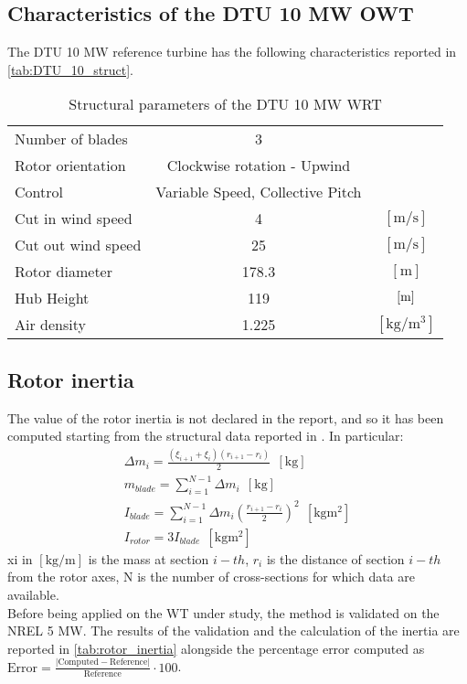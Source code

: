 \subsection{Characteristics of the DTU 10 MW OWT}
The DTU 10 MW reference turbine has the following characteristics reported in \autoref{tab:DTU_10_struct}.
\begin{table}[htb]
    \caption{Structural parameters of the DTU 10 MW \acrshort{WRT}}
    \centering
    \begin{tabular}{lcc}
    \toprule
    Number of blades & 3 & \\
    Rotor orientation & Clockwise rotation - Upwind & \\
    Control & Variable Speed, Collective Pitch & \\
    Cut in wind speed & 4 & $\left[\si{\meter \per \second}\right]$ \\
    Cut out wind speed & 25 & $\left[\si{\meter \per \second}\right]$ \\
    Rotor diameter & 178.3 & $\left[\si{\meter}\right]$\\
    Hub Height & 119 & $\left[\si{\meter}\right]$\\
    Air density & 1.225 & $\left[\si{\kilo\gram\per\cubic\meter}\right]$\\
    \bottomrule
    \end{tabular}
    \label{tab:DTU_10_struct}
\end{table}

\subsection{Rotor inertia}
The value of the rotor inertia is not declared in the report, and so it has been computed starting from the structural data reported in \cite{DTU_Wind_Energy_Report-I-0092}. In particular:
\begin{gather}
    \Delta m_i=\frac{\left(\xi_{i+1} + \xi_i\right)\left(r_{i+1} - r_i\right)}{2} \ \ \left[\si{\kilo\gram}\right] \\
    m_{blade} = \sum_{i=1}^{N-1}\Delta m_i \ \ \left[\si{\kilo\gram}\right]\\
    I_{blade}=\sum_{i=1}^{N-1}\Delta m_i\left(\frac{r_{i+1} - r_i}{2}\right)^2 \ \ \left[\si{\kilo\gram\square\meter}\right]\\
    I_{rotor}=3I_{blade} \ \ \left[\si{\kilo\gram\square\meter}\right]
\end{gather}
\acrshort{xi} in $ \left[\si{\kilo\gram\per\meter}\right]$ is the mass at section $i-th$, $r_i$ is the distance of section $i-th$ from the rotor axes, \acrshort{N} is the number of cross-sections for which data are available.\\
Before being applied on the \acrshort{WT} under study, the method is validated on the NREL 5 MW. The results of the validation and the calculation of the inertia are reported in \autoref{tab:rotor_inertia} alongside the percentage error computed as $\text{Error}=\frac{ |\text{Computed} - \text{Reference}| }{\text{Reference}}\cdot 100$.

